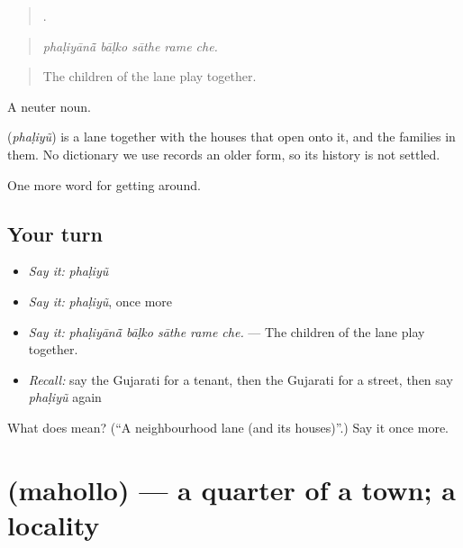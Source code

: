 \begin{quote}
    .
\end{quote}

\begin{quote}
\emph{phaḷiyānā̃ bāḷko sāthe rame che.}
\end{quote}

\begin{quote}
The children of the lane play together.
\end{quote}

A neuter noun.

\begin{cousinweb}
\textbf{} (\emph{phaḷiyũ}) is a lane together with the houses that open onto it, and the families in them. No dictionary we use records an older form, so its history is not settled.
\end{cousinweb}

\begin{grammarlens}[title={What you've built}]
One more word for getting around.
\end{grammarlens}

\subsection*{Your turn}
\begin{itemize}
\raggedright
  \item \emph{Say it:} \emph{phaḷiyũ}
  \item \emph{Say it:} \emph{phaḷiyũ}, once more
  \item \emph{Say it:} \emph{phaḷiyānā̃ bāḷko sāthe rame che.} — The children of the lane play together.
  \item \emph{Recall:} say the Gujarati for a tenant, then the Gujarati for a street, then say \emph{phaḷiyũ} again
\end{itemize}

\begin{tcolorbox}[breakable,colback=teal!4,colframe=teal!35!black,title={Before you move on}]
What does  mean? (\textquotedblleft{}A neighbourhood lane (and its houses)\textquotedblright{}.) Say it once more.
\end{tcolorbox}
\section[\texorpdfstring{\gu{મહોલ્લો} (mahollo)}{મહોલ્લો (mahollo)}]{ (mahollo) — a quarter of a town; a locality}


